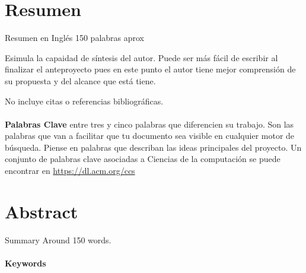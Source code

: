 
\section*{Resumen}
Resumen en Inglés
150 palabras aprox

Esimula la capaidad de síntesis del autor. Puede ser más fácil de escribir al finalizar el anteproyecto pues en este punto el autor tiene mejor comprensión de su propuesta y del alcance que está tiene. 

No incluye citas o referencias bibliográficas\cite{ZHU2022121889}.


\paragraph*{}{\textbf{Palabras Clave}}
entre tres y cinco palabras que diferencien su trabajo. Son las palabras que van a facilitar que tu documento sea visible en cualquier motor de búsqueda. Piense en palabras que describan las ideas principales del proyecto. Un conjunto de palabras clave asociadas a Ciencias de la computación se puede encontrar en \url{https://dl.acm.org/ccs}
\section*{Abstract}
Summary 
Around 150 words. 
\paragraph*{}{\textbf{Keywords}}
